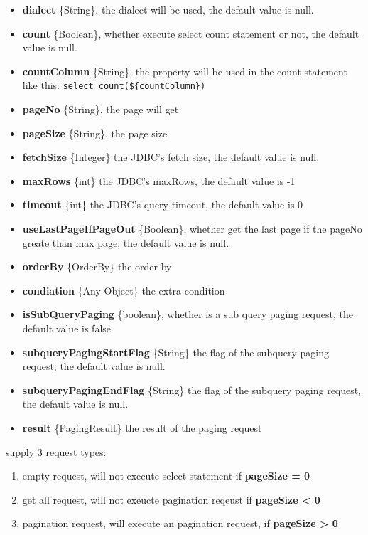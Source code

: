 \documentclass[
]{book}
\providecommand{\tightlist}{%
  \setlength{\itemsep}{0pt}\setlength{\parskip}{0pt}}
\begin{document}
\begin{itemize}
\tightlist
\item
  \textbf{dialect} \{String\}, the dialect will be used, the default value is null.
\item
  \textbf{count} \{Boolean\}, whether execute select count statement or not, the default value is null.
\item
  \textbf{countColumn} \{String\}, the property will be used in the count statement like this: \texttt{select\ count(\$\{countColumn\})}
\item
  \textbf{pageNo} \{String\}, the page will get
\item
  \textbf{pageSize} \{String\}, the page size
\item
  \textbf{fetchSize} \{Integer\} the JDBC's fetch size, the default value is null.
\item
  \textbf{maxRows} \{int\} the JDBC's maxRows, the default value is -1
\item
  \textbf{timeout} \{int\} the JDBC's query timeout, the default value is 0
\item
  \textbf{useLastPageIfPageOut} \{Boolean\}, whether get the last page if the pageNo greate than max page, the default value is null.
\item
  \textbf{orderBy} \{OrderBy\} the order by
\item
  \textbf{condiation} \{Any Object\} the extra condition
\item
  \textbf{isSubQueryPaging} \{boolean\}, whether is a sub query paging request, the default value is false
\item
  \textbf{subqueryPagingStartFlag} \{String\} the flag of the subquery paging request, the default value is null.
\item
  \textbf{subqueryPagingEndFlag} \{String\} the flag of the subquery paging request, the default value is null.
\item
  \textbf{result} \{PagingResult\} the result of the paging request
\end{itemize}

supply 3 request types:

\begin{enumerate}
\def\labelenumi{\arabic{enumi}.}
\tightlist
\item
  empty request, will not execute select statement if \textbf{pageSize = 0}
\item
  get all request, will not exeucte pagination reqeust if \textbf{pageSize \textless{} 0}
\item
  pagination request, will execute an pagination request, if \textbf{pageSize \textgreater{} 0}
\end{enumerate}
\end{document}
